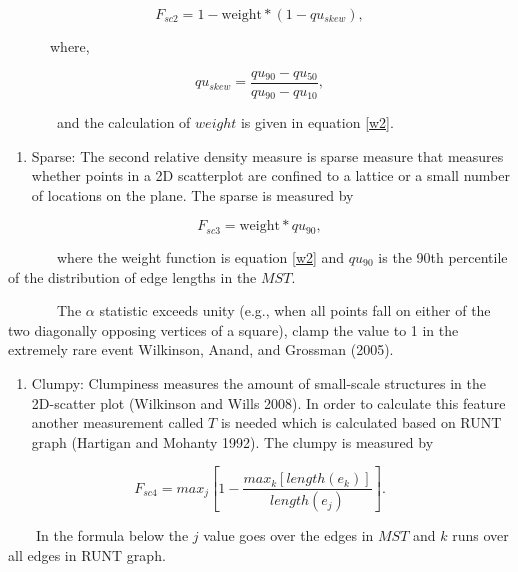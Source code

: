 \documentclass{article}
\begin{document}
\begin{equation}
    F_{sc2} = 1-\text{weight}*(1-qu_{skew}), 
\end{equation}

~~~~~~where,

\begin{equation}
    qu_{skew} = \frac{qu_{90}-qu_{50}}{qu_{90}-qu_{10}}, 
\end{equation}

~~~~~~~and the calculation of \(weight\) is given in equation \ref{w2}.

\begin{enumerate}
\def\labelenumi{\roman{enumi})}
\setcounter{enumi}{2}
\tightlist
\item
  Sparse: The second relative density measure is sparse measure that
  measures whether points in a 2D scatterplot are confined to a lattice
  or a small number of locations on the plane. The sparse is measured by
\end{enumerate}

\begin{equation}
   F_{sc3} = \text{weight} *qu_{90},
\end{equation}

~~~~~~~where the weight function is equation \ref{w2} and \(qu_{90}\) is
the 90th percentile of the distribution of edge lengths in the \(MST\).

~~~~~~~The \(\alpha\) statistic exceeds unity (e.g., when all points
fall on either of the two diagonally opposing vertices of a square),
clamp the value to 1 in the extremely rare event Wilkinson, Anand, and
Grossman (2005).

\begin{enumerate}
\def\labelenumi{\roman{enumi})}
\setcounter{enumi}{3}
\tightlist
\item
  Clumpy: Clumpiness measures the amount of small-scale structures in
  the 2D-scatter plot (Wilkinson and Wills 2008). In order to calculate
  this feature another measurement called \(T\) is needed which is
  calculated based on RUNT graph (Hartigan and Mohanty 1992). The clumpy
  is measured by
\end{enumerate}

\begin{equation}
    F_{sc4} = max_j[1-\frac{max_k[length(e_k)]}{length(e_j)}].
\end{equation}

~~~~In the formula below the \(j\) value goes over the edges in \(MST\)
and \(k\) runs over all edges in RUNT graph.
\end{document}
